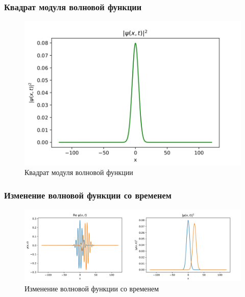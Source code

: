 \documentclass{beamer}
\begin{document}
\begin{frame}
\frametitle{Квадрат модуля волновой функции}

\begin{figure}
    \centering
    \includegraphics[scale=0.5]{images/PsiFunctionPropability.jpg}
    \caption{Квадрат модуля волновой функции}
    \label{fig:my_label}
\end{figure}
    
\end{frame}

\begin{frame}
\frametitle{Изменение волновой функции со временем}

\begin{figure}
    \centering
    \includegraphics[scale=0.35]{images/PsiTimeEvol.jpg}
    \caption{Изменение волновой функции со временем}
    \label{fig:my_label}
\end{figure}
    
\end{frame}
\end{document}
